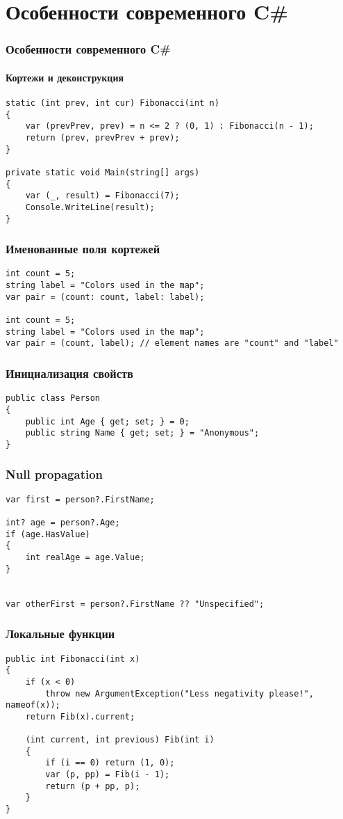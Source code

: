 \documentclass[xetex,mathserif,serif]{beamer}
\begin{document}
    \section{Особенности современного C\#}

    \begin{frame}[fragile]
        \frametitle{Особенности современного C\#}
        \framesubtitle{Кортежи и деконструкция}
        \begin{verbatim}
static (int prev, int cur) Fibonacci(int n)
{
    var (prevPrev, prev) = n <= 2 ? (0, 1) : Fibonacci(n - 1);
    return (prev, prevPrev + prev);
}

private static void Main(string[] args)
{
    var (_, result) = Fibonacci(7);
    Console.WriteLine(result);
}
        \end{verbatim}
    \end{frame}

    \begin{frame}[fragile]
        \frametitle{Именованные поля кортежей}
        \begin{verbatim}
int count = 5;
string label = "Colors used in the map";
var pair = (count: count, label: label);

int count = 5;
string label = "Colors used in the map";
var pair = (count, label); // element names are "count" and "label"
        \end{verbatim}
    \end{frame}

    \begin{frame}[fragile]
        \frametitle{Инициализация свойств}
        \begin{verbatim}
public class Person
{
    public int Age { get; set; } = 0;
    public string Name { get; set; } = "Anonymous";
}
        \end{verbatim}
    \end{frame}

    \begin{frame}[fragile]
        \frametitle{Null propagation}
        \begin{verbatim}
var first = person?.FirstName;

int? age = person?.Age;
if (age.HasValue)
{
    int realAge = age.Value;
}


var otherFirst = person?.FirstName ?? "Unspecified";
        \end{verbatim}
    \end{frame}

    \begin{frame}[fragile]
        \frametitle{Локальные функции}
        \begin{small}
            \begin{verbatim}
public int Fibonacci(int x)
{
    if (x < 0) 
        throw new ArgumentException("Less negativity please!", nameof(x));
    return Fib(x).current;

    (int current, int previous) Fib(int i)
    {
        if (i == 0) return (1, 0);
        var (p, pp) = Fib(i - 1);
        return (p + pp, p);
    }
}
            \end{verbatim}
        \end{small}
    \end{frame}
\end{document}
